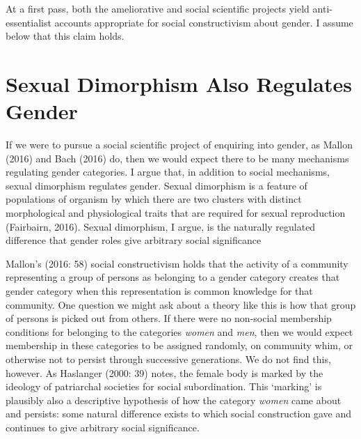 At a first pass, both the ameliorative and social scientific projects
yield anti-essentialist accounts appropriate for social constructivism
about gender. I assume below that this claim holds.

\section*{Sexual Dimorphism Also Regulates Gender}

If we were to pursue a social scientific project of enquiring into
gender, as Mallon (2016) and Bach (2016) do, then we would expect there
to be many mechanisms regulating gender categories. I argue that, in
addition to social mechanisms, sexual dimorphism regulates gender.
Sexual dimorphism is a feature of populations of organism by which there
are two clusters with distinct morphological and physiological traits
that are required for sexual reproduction (Fairbairn, 2016). Sexual
dimorphism, I argue, is the naturally regulated difference that gender
roles give arbitrary social significance

Mallon's (2016: 58) social constructivism holds that the activity of a
community representing a group of persons as belonging to a gender
category creates that gender category when this representation is common
knowledge for that community. One question we might ask about a theory
like this is how that group of persons is picked out from others. If
there were no non-social membership conditions for belonging to the
categories \emph{women} and \emph{men}, then we would expect membership
in these categories to be assigned randomly, on community whim, or
otherwise not to persist through successive generations. We do not find
this, however. As Haslanger (2000: 39) notes, the female body is marked
by the ideology of patriarchal societies for social subordination. This
`marking' is plausibly also a descriptive hypothesis of how the category
\emph{women} came about and persists: some natural difference exists to
which social construction gave and continues to give arbitrary social
significance.

